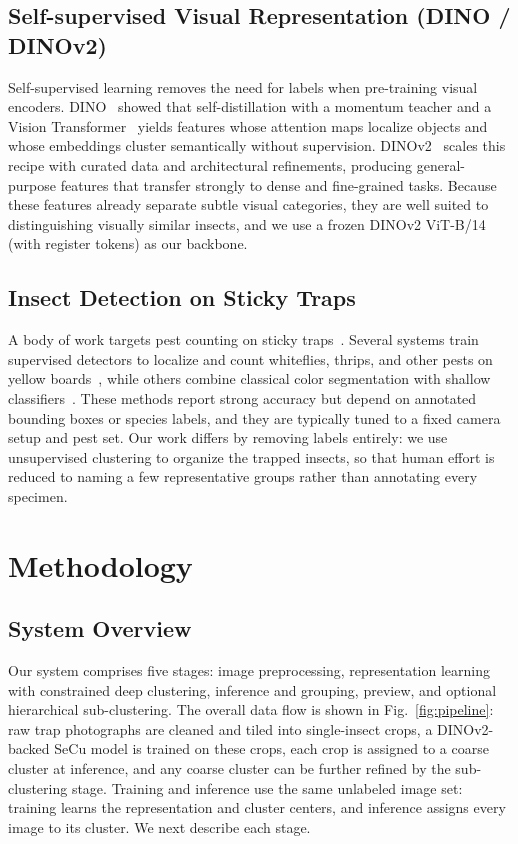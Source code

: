 \documentclass[10pt,a4paper,twocolumn]{article}
\begin{document}
\subsection{Self-supervised Visual Representation (DINO / DINOv2)}
Self-supervised learning removes the need for labels when pre-training visual encoders. DINO~\cite{caron2021dino} showed that self-distillation with a momentum teacher and a Vision Transformer~\cite{dosovitskiy2021vit} yields features whose attention maps localize objects and whose embeddings cluster semantically without supervision. DINOv2~\cite{oquab2024dinov2} scales this recipe with curated data and architectural refinements, producing general-purpose features that transfer strongly to dense and fine-grained tasks. Because these features already separate subtle visual categories, they are well suited to distinguishing visually similar insects, and we use a frozen DINOv2 ViT-B/14 (with register tokens) as our backbone.

\subsection{Insect Detection on Sticky Traps}
A body of work targets pest counting on sticky traps~\cite{hong2022stickyreview}. Several systems train supervised detectors to localize and count whiteflies, thrips, and other pests on yellow boards~\cite{liu2016aphids, wang2021yellowtrap}, while others combine classical color segmentation with shallow classifiers~\cite{rustia2021cascade}. These methods report strong accuracy but depend on annotated bounding boxes or species labels, and they are typically tuned to a fixed camera setup and pest set. Our work differs by removing labels entirely: we use unsupervised clustering to organize the trapped insects, so that human effort is reduced to naming a few representative groups rather than annotating every specimen.

\section{Methodology}

\subsection{System Overview}
Our system comprises five stages: image preprocessing, representation learning with constrained deep clustering, inference and grouping, preview, and optional hierarchical sub-clustering. The overall data flow is shown in Fig.~\ref{fig:pipeline}: raw trap photographs are cleaned and tiled into single-insect crops, a DINOv2-backed SeCu model is trained on these crops, each crop is assigned to a coarse cluster at inference, and any coarse cluster can be further refined by the sub-clustering stage. Training and inference use the same unlabeled image set: training learns the representation and cluster centers, and inference assigns every image to its cluster. We next describe each stage.
\end{document}
